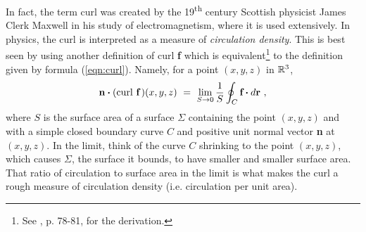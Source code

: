 In fact, the term curl was created by the 19\textsuperscript{th} century Scottish physicist James Clerk Maxwell in his
study of electromagnetism, where it is used extensively. In physics, the curl is interpreted as a measure of
\emph{circulation density}. This is best seen by using another definition of curl \textbf{f} which is
equivalent\footnote{See \cite{sch}, p. 78-81, for the derivation.} to the definition given by
formula (\ref{eqn:curl}). Namely, for a point $(x,y,z)$ in $\mathbb{R}^{3}$,
\begin{equation}\label{eqn:curlalt}
 \textbf{n} \bm{\cdot} (\text{curl}~\textbf{f}\,)(x,y,z) ~=~ \lim_{S \to 0} \frac{1}{S} \oint_{C} \textbf{f} \bm{\cdot} d\textbf{r} ~,
\end{equation}
where $S$ is the surface area of a surface $\Sigma$ containing the point $(x,y,z)$ and with a simple closed boundary
curve $C$ and positive unit normal vector \textbf{n} at $(x,y,z)$. In the limit, think of the curve $C$ shrinking to
the point $(x,y,z)$, which causes $\Sigma$, the surface it bounds, to have smaller and smaller surface area. That ratio
of circulation to surface area in the limit is what makes the curl a rough measure of circulation density (i.e.
circulation per unit area).

